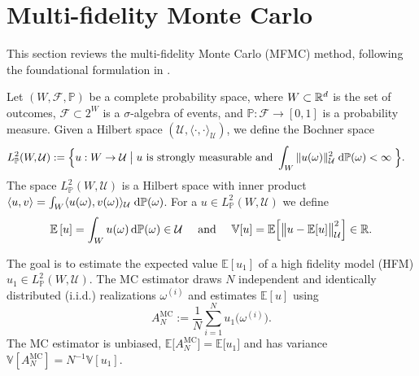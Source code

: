 \section{Multi-fidelity Monte Carlo}\label{sec:MFMC}

This section reviews the multi-fidelity Monte Carlo (MFMC) method, following the foundational formulation in \cite{BPeherstorfer_KWillcox_MDGunzburger_2016a}. 

Let $(W, \mathcal{F}, \mathbb{P})$ be a complete probability space, where
$W \subset \mathbb{R}^d$ is the set of outcomes, $\mathcal{F} \subset 2^{W}$ is a
$\sigma$-algebra of events, and $\mathbb{P}: \mathcal{F} \to [0,1]$ is a
probability measure. Given a Hilbert space $({\mathcal U}, \langle \cdot, \cdot \rangle_{{\mathcal U}})$, we define the Bochner space
\begin{align}     \label{eq:BochnerL2}
  L_{\mathbb{P}}^2(W, {\mathcal U}) := \Big\{ u: W \rightarrow {\mathcal U} \;\big|\; & u \mbox{ is strongly measurable and } 
                                                                  \int_W \| u(\omega) \|_{{\mathcal U}}^2 \; \textup{d}\mathbb{P}(\omega) < \infty \; \Big\}.
\end{align}
The space $ L_{\mathbb{P}}^2(W, {\mathcal U})$ is a Hilbert space with inner product 
$ \langle u, v \rangle =  \int_W  \langle  u(\omega) , v(\omega)  \rangle_{{\mathcal U}} \; \textup{d}\mathbb{P}(\omega)$.
For a $u \in  L_{\mathbb{P}}^2(W, {\mathcal U})$ we define
\begin{equation}   \label{eq:variance_of_u}
           \mathbb{E}\left[u \right]=\int_W u(\omega) \, \textup{d} \mathbb{P}(\omega) \in  {\mathcal U}
           \quad \mbox{ and } \quad
           \mathbb{V}[u] = \mathbb{E}\Big[  \big\| u - \mathbb{E}[u]  \big\|_{{\mathcal U}}^2 \Big] \in \mathbb{R}.
  \end{equation}




The goal is to estimate the expected value $\mathbb{E}[u_1 ]$ of a high fidelity model (HFM) $u_1 \in   L_{\mathbb{P}}^2(W, {\mathcal U})$.
The  MC estimator draws $N$ independent and identically distributed (i.i.d.) realizations $\omega^{(i)}$
and estimates $\mathbb{E}[u ]$ using
\begin{equation}\label{eq:MC_estimator}
    A^{\text{MC}}_{N} := \frac{1}{N}\sum_{i=1}^{N} u_1 \big(\omega^{(i)} \big).
\end{equation}
The MC estimator is unbiased, $\mathbb{E}\big[ A^{\text{MC}}_N \big] = \mathbb{E}\big[ u_1 \big]$
and has variance $\mathbb{V}[A^{\text{MC}}_{N}] = N^{-1} \mathbb{V}[u_1 ]$.



